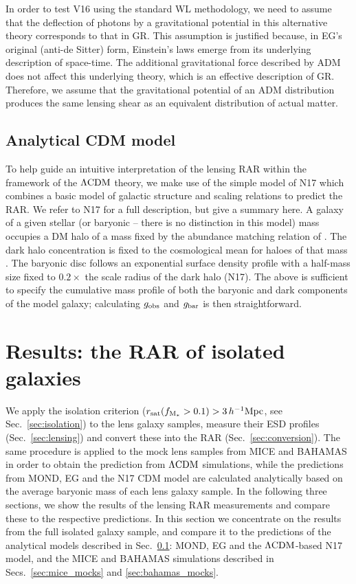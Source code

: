 \documentclass[usenatbib]{mnras}
\newcommand{\hMpc}{\, h^{-1}{\rm{Mpc}} }
\newcommand{\lcdm}{{\rm \Lambda CDM}}
\newcommand{\un}[1]{_{\rm #1}}
\begin{document}
In order to test V16 using the standard WL methodology, we need to assume that the deflection of photons by a gravitational potential in this alternative theory corresponds to that in GR. This assumption is justified because, in EG's original (anti-de Sitter) form, Einstein's laws emerge from its underlying description of space-time. The additional gravitational force described by ADM does not affect this underlying theory, which is an effective description of GR. Therefore, we assume that the gravitational potential of an ADM distribution produces the same lensing shear as an equivalent distribution of actual matter.

\subsection{Analytical CDM model}
\label{sec:analytical}

To help guide an intuitive interpretation of the lensing RAR within the framework of the $\lcdm$ theory, we make use of the simple model of N17 which combines a basic model of galactic structure and scaling relations to predict the RAR. We refer to N17 for a full description, but give a summary here. A galaxy of a given stellar (or baryonic -- there is no distinction in this model) mass occupies a DM halo of a mass fixed by the abundance matching relation of \citet{behroozi2013}. The dark halo concentration is fixed to the cosmological mean for haloes of that mass \citep{ludlow2014}. The baryonic disc follows an exponential surface density profile with a half-mass size fixed to $0.2\times$ the scale radius of the dark halo (N17). The above is sufficient to specify the cumulative mass profile of both the baryonic and dark components of the model galaxy; calculating $g\un{obs}$ and $g\un{bar}$ is then straightforward.


\section{Results: the RAR of isolated galaxies}
\label{sec:results}

We apply the isolation criterion ($r\un{sat}(f\un{M_*}>0.1)>3\hMpc$, see Sec.~\ref{sec:isolation}) to the lens galaxy samples, measure their ESD profiles (Sec.~\ref{sec:lensing}) and convert these into the RAR (Sec.~\ref{sec:conversion}). The same procedure is applied to the mock lens samples from MICE and BAHAMAS in order to obtain the prediction from $\lcdm$ simulations, while the predictions from MOND, EG and the N17 CDM model are calculated analytically based on the average baryonic mass of each lens galaxy sample. In the following three sections, we show the results of the lensing RAR measurements and compare these to the respective predictions. In this section we concentrate on the results from the full isolated galaxy sample, and compare it to the predictions of the analytical models described in Sec.~\ref{sec:analytical}: MOND, EG and the $\lcdm$-based N17 model, and the MICE and BAHAMAS simulations described in Secs.~\ref{sec:mice_mocks} and \ref{sec:bahamas_mocks}.
\end{document}
